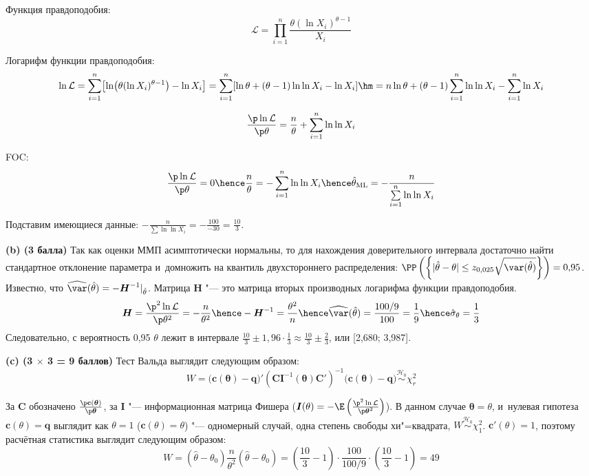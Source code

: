 \documentclass[pdftex,11pt,openany]{book}\usepackage[]{graphicx}\usepackage[]{color}
\newcommand{\calL}{\mathcal{L}}
\newcommand{\bs}[1]{\boldsymbol{#1}}
\newcommand{\hypo}{\mathcal{H}}
\newcommand{\simhypo}{\ensuremath{\mathrel{\stackrel{\hypo_0}{\sim}}}}
\begin{document}
\begin{solution}
 Функция правдоподобия: \[\calL = \prod_{i=1}^{n} \frac{\theta (\ln X_i)^{\theta-1}}{X_i}\]

Логарифм функции правдоподобия: \[\ln \calL = \sum\limits_{i=1}^{n} \bigl[\ln \bigl(\theta (\ln X_i)^{\theta-1} \bigr) - \ln X_i \bigr] = \sum\limits_{i=1}^{n} [\ln \theta + (\theta-1) \ln\ln X_i - \ln X_i] \hm= n \ln \theta + (\theta-1) \sum\limits_{i=1}^{n} \ln \ln X_i - \sum\limits_{i=1}^{n} \ln X_i\]

\[\frac{\p \ln \calL}{\p \theta} = \frac{n}{\theta} + \sum\limits_{i=1}^{n} \ln \ln X_i \]

FOC: \[\frac{\p \ln \calL}{\p \theta} = 0 \hence \frac{n}{\theta} = -\sum\limits_{i=1}^{n} \ln \ln X_i \hence \hat\theta_{\text{ML}} = - \frac{n}{\sum\limits_{i=1}^{n} \ln \ln X_i} \]

Подставим имеющиеся данные: $- \frac{n}{\sum \ln \ln X_i} = -\frac{100}{-30} = \frac{10}{3}$.

\par\smallskip

\textbf{(b) (3 балла)} Так как оценки ММП асимптотически нормальны, то для нахождения доверительного интервала достаточно найти стандартное отклонение параметра  и~домножить на квантиль двухстороннего распределения: $\PP\left(\left\{|\hat\theta-\theta| \le z_{0{,}025} \sqrt{\var(\hat\theta)}\right\}\right) = 0{,}95$. Известно, что $\widehat{\var}(\hat \theta) = -\bs{H}^{-1} |_{\hat\theta}$. Матрица $\bs{H}$ "--- это матрица вторых производных логарифма функции правдоподобия.
\[
\bs{H} = \frac{\p^2 \ln \calL}{\p \theta^2} = -\frac{n}{\theta^2} \hence -\bs{H}^{-1} = \frac{\theta^2}{n} \hence \widehat{\var}(\hat\theta) = \frac{100/9}{100} = \frac19 \hence \hat\sigma_{\theta} = \frac13
\]
Следовательно, с вероятность 0,95 $\theta$ лежит в интервале $\frac{10}{3} \pm 1{,}96 \cdot \frac{1}{3} \approx \frac{10}{3} \pm \frac{2}{3}$, или [2{,}680; 3{,}987].

\par\smallskip

\textbf{(c) (3 $\times$ 3 = 9 баллов)} Тест Вальда  выглядит следующим образом:
\[
W = \bigl(\mathbf{c}(\bs\theta) - \bs{q}\bigr)' (\bs{C} \bs{I}^{-1}(\bs\theta) \bs{C}')^{-1} \bigl(\mathbf{c}(\bs\theta) - \bs{q} \bigr) \simhypo \chi^2_{r}
\]

За $\bs{C}$ обозначено $\frac{\p \mathbf{c}(\bs\theta)}{\p \bs\theta}$, за $\bs{I}$ "--- информационная матрица Фишера ($\bs{I}(\theta) = -\E\left( \frac{\p^2 \ln \calL}{\p \bs\theta^2} \right)$). В данном случае $\bs\theta = \theta$, и~нулевая гипотеза $\mathbf{c}(\theta) = \bs{q}$ выглядит как $\theta=1$ ($\mathbf{c}(\theta) = \theta$) "--- одномерный случай, одна степень свободы хи"=квадрата, $W \simhypo \chi^2_1$. $\mathbf{c}'(\theta) = 1$, поэтому расчётная статистика выглядит следующим образом:
\[
W = (\hat\theta - \theta_0) \frac{n}{\theta^2} (\hat\theta - \theta_0) = \left( \frac{10}{3} - 1 \right) \cdot \frac{100}{100/9} \cdot \left( \frac{10}{3} - 1 \right) = 49
\]


\end{solution}
\end{document}
